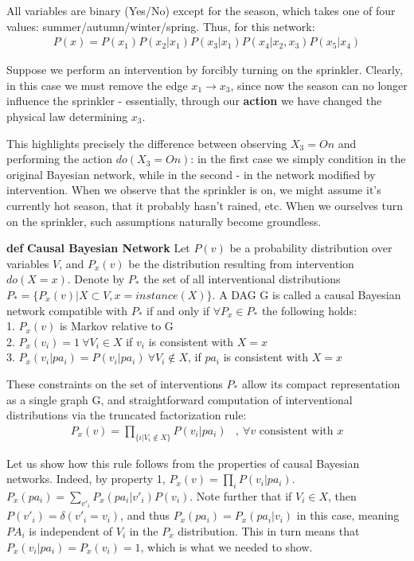 \documentclass[fleqn]{article}
\def\define#1{\textbf{def} \textbf{#1}}
\numberwithin{equation}{section}
\numberwithin{theorem}{section}
\numberwithin{figure}{section}
\numberwithin{lemma}{section}
\numberwithin{corollary}{section}
\begin{document}
All variables are binary (Yes/No) except for the season, which takes one of four values: summer/autumn/winter/spring. Thus, for this network:
\begin{align}
	P(x) = P(x_1)P(x_2|x_1)P(x_3|x_1)P(x_4|x_2,x_3)P(x_5|x_4)
\end{align}

Suppose we perform an intervention by forcibly turning on the sprinkler. Clearly, in this case we must remove the edge $x_1 \rightarrow x_3$, since now the season can no longer influence the sprinkler - essentially, through our \textbf{action} we have changed the physical law determining $x_3$. 

This highlights precisely the difference between observing $X_3=On$ and performing the action $do(X_3 = On)$: in the first case we simply condition in the original Bayesian network, while in the second - in the network modified by intervention. When we observe that the sprinkler is on, we might assume it's currently hot season, that it probably hasn't rained, etc. When we ourselves turn on the sprinkler, such assumptions naturally become groundless.

\define{Causal Bayesian Network} Let $P(v)$ be a probability distribution over variables $V$, and $P_x(v)$ be the distribution resulting from intervention $do(X=x)$. Denote by $P_*$ the set of all interventional distributions $P_* = \{P_x(v)| X \subset V, x = instance(X)\}$. A DAG G is called a causal Bayesian network compatible with $P_*$ if and only if $\forall P_x \in P_*$ the following holds:\\
1. $P_x(v)$ is Markov relative to G\\
2. $P_x(v_i) = 1 \ \forall V_i \in X$ if $v_i$ is consistent with $X=x$ \\
3. $P_x(v_i|pa_i) = P(v_i|pa_i) \ \forall V_i \notin X$, if $pa_i$ is consistent with $X=x$

These constraints on the set of interventions $P_*$ allow its compact representation as a single graph G, and straightforward computation of interventional distributions via the truncated factorization rule:
\begin{align}
	P_x(v) = \prod\limits_{\{i|V_i \notin X\}}P(v_i|pa_i) &, \ \forall v \text{ consistent with } x
\end{align} 

Let us show how this rule follows from the properties of causal Bayesian networks. Indeed, by property 1, $P_x(v) = \prod\limits_{i}P(v_i|pa_i)$. $P_x(pa_i) = \sum\limits_{v'_i}P_x(pa_i|v'_i)P(v_i)$. Note further that if $V_i \in X$, then $P(v'_i) = \delta(v'_i = v_i)$, and thus $P_x(pa_i) = P_x(pa_i|v_i)$ in this case, meaning $PA_i$ is independent of $V_i$ in the $P_x$ distribution. This in turn means that $P_x(v_i | pa_i) = P_x(v_i) = 1$, which is what we needed to show.
\end{document}
